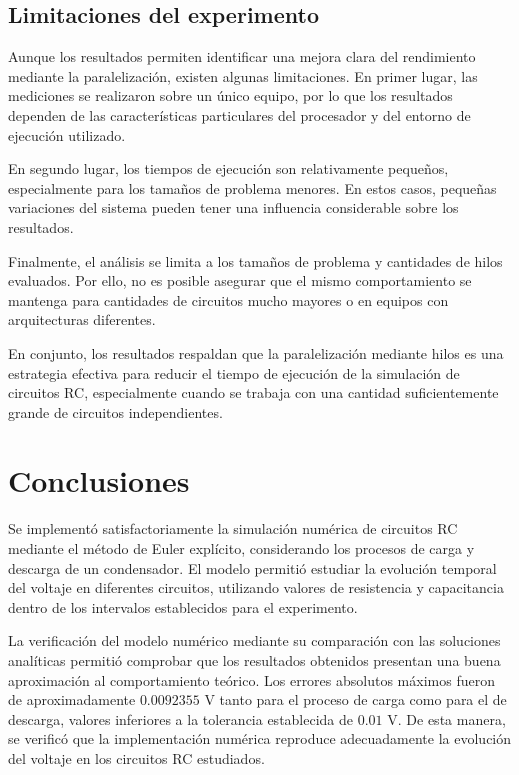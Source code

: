 \documentclass[11pt,a4paper]{article}
\begin{document}
\subsection{Limitaciones del experimento}

Aunque los resultados permiten identificar una mejora clara del rendimiento mediante la paralelización, existen algunas limitaciones. En primer lugar, las mediciones se realizaron sobre un único equipo, por lo que los resultados dependen de las características particulares del procesador y del entorno de ejecución utilizado.

En segundo lugar, los tiempos de ejecución son relativamente pequeños, especialmente para los tamaños de problema menores. En estos casos, pequeñas variaciones del sistema pueden tener una influencia considerable sobre los resultados.

Finalmente, el análisis se limita a los tamaños de problema y cantidades de hilos evaluados. Por ello, no es posible asegurar que el mismo comportamiento se mantenga para cantidades de circuitos mucho mayores o en equipos con arquitecturas diferentes.

En conjunto, los resultados respaldan que la paralelización mediante hilos es una estrategia efectiva para reducir el tiempo de ejecución de la simulación de circuitos RC, especialmente cuando se trabaja con una cantidad suficientemente grande de circuitos independientes.



\section{Conclusiones}

Se implementó satisfactoriamente la simulación numérica de circuitos RC mediante el método de Euler explícito, considerando los procesos de carga y descarga de un condensador. El modelo permitió estudiar la evolución temporal del voltaje en diferentes circuitos, utilizando valores de resistencia y capacitancia dentro de los intervalos establecidos para el experimento.

La verificación del modelo numérico mediante su comparación con las soluciones analíticas permitió comprobar que los resultados obtenidos presentan una buena aproximación al comportamiento teórico. Los errores absolutos máximos fueron de aproximadamente $0.0092355$ V tanto para el proceso de carga como para el de descarga, valores inferiores a la tolerancia establecida de $0.01$ V. De esta manera, se verificó que la implementación numérica reproduce adecuadamente la evolución del voltaje en los circuitos RC estudiados.
\end{document}
